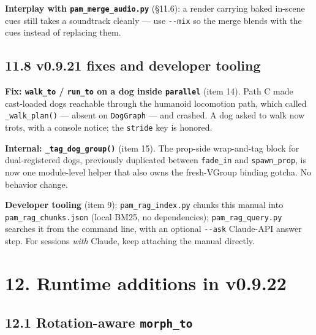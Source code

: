 \documentclass[
  12pt,
  letterpaper,
]{book}
\begin{document}
\textbf{Interplay with \texttt{pam\_merge\_audio.py}} (§11.6): a
render carrying baked in-scene cues still takes a soundtrack cleanly
--- use \texttt{-{}-mix} so the merge blends with the cues instead of
replacing them.

\subsection{\texorpdfstring{11.8 v0.9.21 fixes and developer
tooling}{11.8 v0.9.21 fixes and developer tooling}}\label{v0921-fixes-and-tooling}

\textbf{Fix: \texttt{walk\_to} / \texttt{run\_to} on a dog inside
\texttt{parallel}} (item 14). Path C made cast-loaded dogs reachable
through the humanoid locomotion path, which called
\texttt{\_walk\_plan()} --- absent on \texttt{DogGraph} --- and
crashed. A dog asked to walk now trots, with a console notice; the
\texttt{stride} key is honored.

\textbf{Internal: \texttt{\_tag\_dog\_group()}} (item 15). The
prop-side wrap-and-tag block for dual-registered dogs, previously
duplicated between \texttt{fade\_in} and \texttt{spawn\_prop}, is now
one module-level helper that also owns the fresh-VGroup binding
gotcha. No behavior change.

\textbf{Developer tooling} (item 9): \texttt{pam\_rag\_index.py}
chunks this manual into \texttt{pam\_rag\_chunks.json} (local BM25, no
dependencies); \texttt{pam\_rag\_query.py} searches it from the
command line, with an optional \texttt{-{}-ask} Claude-API answer
step. For sessions \emph{with} Claude, keep attaching the manual
directly.

\section{12. Runtime additions in
v0.9.22}\label{runtime-additions-in-v0.9.22}

\subsection{\texorpdfstring{12.1 Rotation-aware
\texttt{morph\_to}}{12.1 Rotation-aware morph\_to}}\label{rotation-aware-morph-to}
\end{document}
